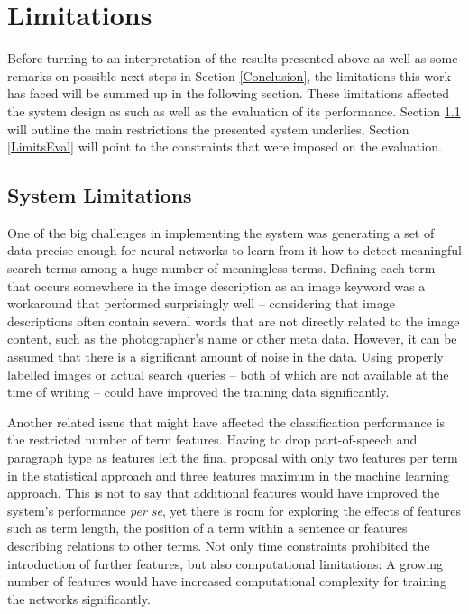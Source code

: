 \documentclass[11pt,a4paper,twoside]{article}
\begin{document}
\cleardoublepage

\section{Limitations} \label{Limits}

Before turning to an interpretation of the results presented above as well as some remarks on possible next steps in Section \ref{Conclusion}, the limitations this work has faced will be summed up in the following section. These limitations affected the system design as such as well as the evaluation of its performance. Section \ref{LimitsSystem} will outline the main restrictions the presented system underlies, Section \ref{LimitsEval} will point to the constraints that were imposed on the evaluation.

\subsection{System Limitations} \label{LimitsSystem}

One of the big challenges in implementing the system was generating a set of data precise enough for neural networks to learn from it how to detect meaningful search terms among a huge number of meaningless terms. Defining each term that occurs somewhere in the image description as an image keyword was a workaround that performed surprisingly well -- considering that image descriptions often contain several words that are not directly related to the image content, such as the photographer's name or other meta data. However, it can be assumed that there is a significant amount of noise in the data. Using properly labelled images or actual search queries -- both of which are not available at the time of writing -- could have improved the training data significantly.

Another related issue that might have affected the classification performance is the restricted number of term features. Having to drop part-of-speech and paragraph type as features left the final proposal with only two features per term in the statistical approach and three features maximum in the machine learning approach. This is not to say that additional features would have improved the system's performance \emph{per se}, yet there is room for exploring the effects of features such as term length, the position of a term within a sentence or features describing relations to other terms. Not only time constraints prohibited the introduction of further features, but also computational limitations: A growing number of features would have increased computational complexity for training the networks significantly.
\end{document}
